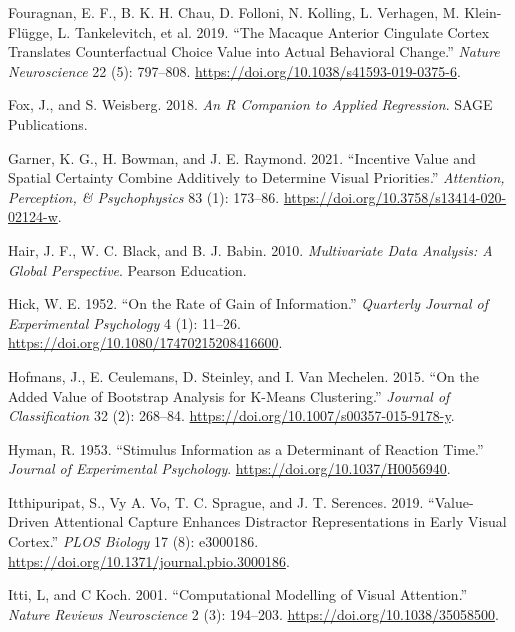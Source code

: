 \documentclass[11pt,halfline,a4paper,]{ouparticle}
\newlength{\cslhangindent}
\newenvironment{cslreferences}%
  {\setlength{\parindent}{0pt}%
  \everypar{\setlength{\hangindent}{\cslhangindent}}\ignorespaces}%
  {\par}
\begin{document}
\begin{cslreferences}
\leavevmode\hypertarget{ref-fouragnanMacaqueAnteriorCingulate2019a}{}%
Fouragnan, E. F., B. K. H. Chau, D. Folloni, N. Kolling, L. Verhagen, M. Klein-Flügge, L. Tankelevitch, et al. 2019. ``The Macaque Anterior Cingulate Cortex Translates Counterfactual Choice Value into Actual Behavioral Change.'' \emph{Nature Neuroscience} 22 (5): 797--808. \url{https://doi.org/10.1038/s41593-019-0375-6}.

\leavevmode\hypertarget{ref-foxCompanionAppliedRegression2018}{}%
Fox, J., and S. Weisberg. 2018. \emph{An R Companion to Applied Regression}. SAGE Publications.

\leavevmode\hypertarget{ref-garnerIncentiveValueSpatial2021a}{}%
Garner, K. G., H. Bowman, and J. E. Raymond. 2021. ``Incentive Value and Spatial Certainty Combine Additively to Determine Visual Priorities.'' \emph{Attention, Perception, \& Psychophysics} 83 (1): 173--86. \url{https://doi.org/10.3758/s13414-020-02124-w}.

\leavevmode\hypertarget{ref-hairMultivariateDataAnalysis2010}{}%
Hair, J. F., W. C. Black, and B. J. Babin. 2010. \emph{Multivariate Data Analysis: A Global Perspective}. Pearson Education.

\leavevmode\hypertarget{ref-hickRateGainInformation1952}{}%
Hick, W. E. 1952. ``On the Rate of Gain of Information.'' \emph{Quarterly Journal of Experimental Psychology} 4 (1): 11--26. \url{https://doi.org/10.1080/17470215208416600}.

\leavevmode\hypertarget{ref-hofmansAddedValueBootstrap2015}{}%
Hofmans, J., E. Ceulemans, D. Steinley, and I. Van Mechelen. 2015. ``On the Added Value of Bootstrap Analysis for K-Means Clustering.'' \emph{Journal of Classification} 32 (2): 268--84. \url{https://doi.org/10.1007/s00357-015-9178-y}.

\leavevmode\hypertarget{ref-hymanStimulusInformationDeterminant1953}{}%
Hyman, R. 1953. ``Stimulus Information as a Determinant of Reaction Time.'' \emph{Journal of Experimental Psychology}. \url{https://doi.org/10.1037/H0056940}.

\leavevmode\hypertarget{ref-itthipuripatValuedrivenAttentionalCapture2019}{}%
Itthipuripat, S., Vy A. Vo, T. C. Sprague, and J. T. Serences. 2019. ``Value-Driven Attentional Capture Enhances Distractor Representations in Early Visual Cortex.'' \emph{PLOS Biology} 17 (8): e3000186. \url{https://doi.org/10.1371/journal.pbio.3000186}.

\leavevmode\hypertarget{ref-ittiComputationalModellingVisual2001}{}%
Itti, L, and C Koch. 2001. ``Computational Modelling of Visual Attention.'' \emph{Nature Reviews Neuroscience} 2 (3): 194--203. \url{https://doi.org/10.1038/35058500}.


\end{cslreferences}
\end{document}
